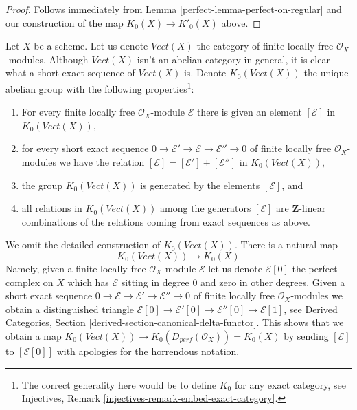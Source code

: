 \begin{proof}

Follows immediately from Lemma \ref{perfect-lemma-perfect-on-regular}
and our construction of the map $K_0(X) \to K'_0(X)$ above.
\end{proof}

Let $X$ be a scheme. Let us denote $\textit{Vect}(X)$ the category
of finite locally free $\mathcal{O}_X$-modules. Although
$\textit{Vect}(X)$ isn't an abelian category in general, it
is clear what a short exact sequence of $\textit{Vect}(X)$ is.
Denote $K_0(\textit{Vect}(X))$ the unique abelian group with the
following properties\footnote{The correct generality here
would be to define $K_0$ for any exact category, see
Injectives, Remark \ref{injectives-remark-embed-exact-category}.}:
\begin{enumerate}
\item For every finite locally free $\mathcal{O}_X$-module $\mathcal{E}$ there
is given an element $[\mathcal{E}]$ in $K_0(\textit{Vect}(X))$,
\item for every short exact sequence
$0 \to \mathcal{E}' \to \mathcal{E} \to \mathcal{E}'' \to 0$
of finite locally free $\mathcal{O}_X$-modules we have the relation
$[\mathcal{E}] = [\mathcal{E}'] + [\mathcal{E}'']$ in $K_0(\textit{Vect}(X))$,
\item the group $K_0(\textit{Vect}(X))$ is generated by the elements
$[\mathcal{E}]$, and
\item all relations in $K_0(\textit{Vect}(X))$ among the generators
$[\mathcal{E}]$ are $\mathbf{Z}$-linear combinations
of the relations coming from exact sequences as above.
\end{enumerate}
We omit the detailed construction of $K_0(\textit{Vect}(X))$.
There is a natural map
$$
K_0(\textit{Vect}(X)) \longrightarrow K_0(X)
$$
Namely, given a finite locally free $\mathcal{O}_X$-module $\mathcal{E}$
let us denote $\mathcal{E}[0]$ the perfect complex on $X$ which has
$\mathcal{E}$ sitting in degree $0$ and zero in other degrees.
Given a short exact sequence
$0 \to \mathcal{E} \to \mathcal{E}' \to \mathcal{E}'' \to 0$ of finite
locally free $\mathcal{O}_X$-modules we obtain a distinguished triangle
$\mathcal{E}[0] \to \mathcal{E}'[0] \to \mathcal{E}''[0] \to \mathcal{E}[1]$,
see Derived Categories, Section \ref{derived-section-canonical-delta-functor}.
This shows that we obtain a map
$K_0(\textit{Vect}(X)) \to K_0(D_{perf}(\mathcal{O}_X)) = K_0(X)$
by sending $[\mathcal{E}]$ to $[\mathcal{E}[0]]$
with apologies for the horrendous notation.

